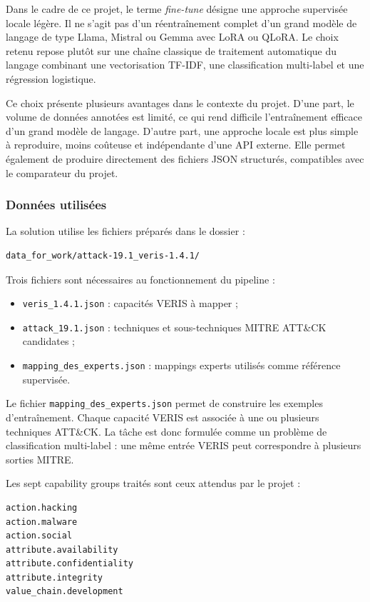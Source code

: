 \documentclass[a4paper,12pt]{article}
\begin{document}
Dans le cadre de ce projet, le terme \emph{fine-tune} désigne une approche supervisée locale légère. Il ne s'agit pas d'un réentraînement complet d'un grand modèle de langage de type Llama, Mistral ou Gemma avec LoRA ou QLoRA. Le choix retenu repose plutôt sur une chaîne classique de traitement automatique du langage combinant une vectorisation TF-IDF, une classification multi-label et une régression logistique.

Ce choix présente plusieurs avantages dans le contexte du projet. D'une part, le volume de données annotées est limité, ce qui rend difficile l'entraînement efficace d'un grand modèle de langage. D'autre part, une approche locale est plus simple à reproduire, moins coûteuse et indépendante d'une API externe. Elle permet également de produire directement des fichiers JSON structurés, compatibles avec le comparateur du projet.

\subsubsection{Données utilisées}

La solution utilise les fichiers préparés dans le dossier :

\begin{verbatim}
data_for_work/attack-19.1_veris-1.4.1/
\end{verbatim}

Trois fichiers sont nécessaires au fonctionnement du pipeline :

\begin{itemize}
    \item \texttt{veris\_1.4.1.json} : capacités VERIS à mapper ;
    \item \texttt{attack\_19.1.json} : techniques et sous-techniques MITRE ATT\&CK candidates ;
    \item \texttt{mapping\_des\_experts.json} : mappings experts utilisés comme référence supervisée.
\end{itemize}

Le fichier \texttt{mapping\_des\_experts.json} permet de construire les exemples d'entraînement. Chaque capacité VERIS est associée à une ou plusieurs techniques ATT\&CK. La tâche est donc formulée comme un problème de classification multi-label : une même entrée VERIS peut correspondre à plusieurs sorties MITRE.

Les sept capability groups traités sont ceux attendus par le projet :

\begin{verbatim}
action.hacking
action.malware
action.social
attribute.availability
attribute.confidentiality
attribute.integrity
value_chain.development
\end{verbatim}
\end{document}
